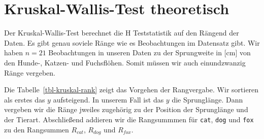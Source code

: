 \documentclass[
  letterpaper,
]{scrbook}
\begin{document}
\hypertarget{kruskal-wallis-test-theoretisch}{%
\section{Kruskal-Wallis-Test
theoretisch}\label{kruskal-wallis-test-theoretisch}}

Der Kruskal-Wallis-Test berechnet die H Teststatistik auf den Rängend
der Daten. Es gibt genau soviele Ränge wie es Beobachtungen im Datensatz
gibt. Wir haben \(n = 21\) Beobachtungen in unseren Daten zu der
Sprungweite in {[}cm{]} von den Hunde-, Katzen- und Fuchsflöhen. Somit
müssen wir auch einundzwanzig Ränge vergeben.

Die Tabelle~\ref{tbl-kruskal-rank} zeigt das Vorgehen der Rangvergabe.
Wir sortieren als erstes das \(y\) aufsteigend. In unserem Fall ist das
\(y\) die Sprunglänge. Dann vergeben wir die Ränge jweiles zugehörig zu
der Position der Sprunglänge und der Tierart. Abschließend addieren wir
die Rangsummmen für \texttt{cat}, \texttt{dog} und \texttt{fox} zu den
Rangsummen \(R_{cat}\), \(R_{dog}\) und \(R_{fox}\).
\end{document}
